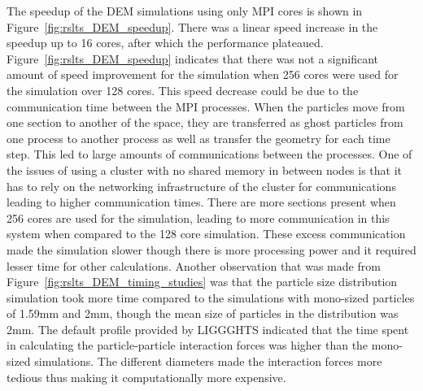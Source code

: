 \documentclass[preprint,11pt,authoryear]{elsarticle}
\begin{document}
The speedup of the DEM simulations using only MPI cores is shown in Figure~\ref{fig:rslts_DEM_speedup}.
There was a linear speed increase in the speedup up to 16 cores, after which the 
performance plateaued. Figure~\ref{fig:rslts_DEM_speedup} indicates that there 
was not a significant amount of speed improvement for the simulation when 256 cores were used for the 
simulation over 128 cores. This speed decrease could be due to the communication time between 
the MPI processes. When the particles move from one section to another of the space, they are 
transferred as ghost particles from one process to another process as well as transfer the geometry 
for each time step. This led to large amounts of communications between the processes. 
One of the issues of using a cluster with no shared memory in between nodes is that it has to 
rely on the networking infrastructure of the cluster for communications leading to higher 
communication times. There are more sections present when 256 cores are used for the 
simulation, leading to more communication in this system when compared to the 128 core simulation. 
These excess communication made the simulation slower though there is more processing power and 
it required lesser time for other calculations. Another observation that was made from Figure~\ref{fig:rslts_DEM_timing_studies} was that the particle size distribution simulation took more time 
compared to the simulations with mono-sized particles of 1.59mm and 2mm, though the mean size of 
particles in the distribution was 2mm. The default profile provided by LIGGGHTS indicated that the time 
spent in calculating the particle-particle interaction forces was higher than the mono-sized 
simulations. The different diameters made the interaction forces more tedious thus making it 
computationally more expensive. 
\end{document}
